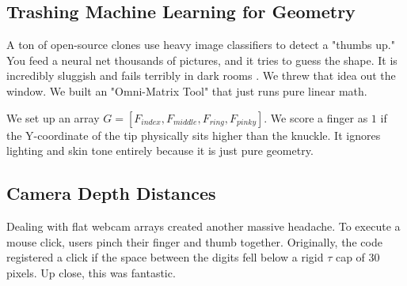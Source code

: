 \documentclass[conference]{IEEEtran}
\begin{document}
\subsection{Trashing Machine Learning for Geometry}
A ton of open-source clones use heavy image classifiers to detect a "thumbs up." You feed a neural net thousands of pictures, and it tries to guess the shape. It is incredibly sluggish and fails terribly in dark rooms \cite{b4}. We threw that idea out the window. We built an "Omni-Matrix Tool" that just runs pure linear math.

We set up an array \(G = [F_{index}, F_{middle}, F_{ring}, F_{pinky}]\). We score a finger as $1$ if the Y-coordinate of the tip physically sits higher than the knuckle. It ignores lighting and skin tone entirely because it is just pure geometry.

\begin{table}[htbp]
\centering
\caption{Geometric Multi-Finger Command Matrix}
\label{tab:geometry}
\end{table}

\subsection{Camera Depth Distances}
Dealing with flat webcam arrays created another massive headache. To execute a mouse click, users pinch their finger and thumb together. Originally, the code registered a click if the space between the digits fell below a rigid $\tau$ cap of 30 pixels. Up close, this was fantastic. 
\end{document}
